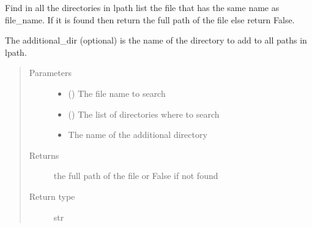 \documentclass[a4paper,10pt,english]{sphinxmanual}
\begin{document}

\begin{fulllineitems}
\label{\detokenize{commands/apidoc/src:src.__init__.find_file_in_lpath}}
Find in all the directories in lpath list the file that has the same name
as file\_name. 
If it is found 
then return the full path of the file
else return False.

The additional\_dir (optional) is the name of the directory to add to all 
paths in lpath.
\begin{quote}\begin{description}
\item[{Parameters}] \leavevmode\begin{itemize}
\item {} 
 () \textendash{} The file name to search

\item {} 
 () \textendash{} The list of directories where to search

\item {} 
 \textendash{} The name of the additional directory

\end{itemize}

\item[{Returns}] \leavevmode
the full path of the file or False if not found

\item[{Return type}] \leavevmode
str

\end{description}\end{quote}

\end{fulllineitems}

\end{document}
